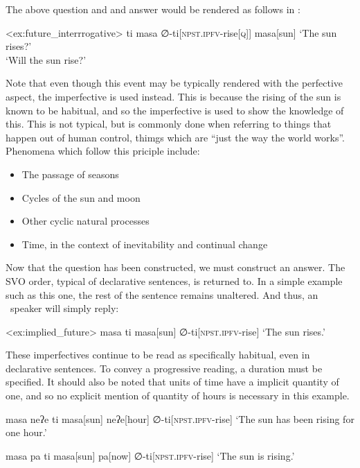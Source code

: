 The above question and and answer would be rendered as follows in \langname :

\ex<ex:future_interrrogative>
\begingl
\glpreamble ti masa
\endpreamble
∅-ti[\textsc{npst.ipfv-}rise\textsc{[q]}]
masa[sun]
\glft `The sun rises?'\\`Will the sun rise?'
\endgl
\xe

Note that even though this event may be typically rendered with the perfective aspect, the imperfective is used instead.
This is because the rising of the sun is known to be habitual, and so the imperfective is used to show the knowledge of this.
This is not typical, but is commonly done when referring to things that happen out of human control, thimgs which are ``just the way the world works''.
Phenomena which follow this priciple include:

\begin{itemize}
  \item The passage of seasons
  \item Cycles of the sun and moon
  \item Other cyclic natural processes
  \item Time, in the context of inevitability and continual change
\end{itemize}

Now that the question has been constructed, we must construct an answer.
The SVO order, typical of declarative sentences, is returned to.
In a simple example such as this one, the rest of the sentence remains unaltered.
And thus, an \langname\ speaker will simply reply:

\ex<ex:implied_future>
\begingl
\glpreamble masa ti
\endpreamble
masa[sun] ∅-ti[\textsc{npst.ipfv-}rise]
\glft `The sun rises.'
\endgl
\xe

These imperfectives continue to be read as specifically habitual, even in declarative sentences.
To convey a progressive reading, a duration must be specified.
It should also be noted that units of time have a implicit quantity of one, and so no explicit mention of quantity of hours is necessary in this example.

\ex
\begingl
\glpreamble masa neʔe ti
\endpreamble
masa[sun]
neʔe[hour]
∅-ti[\textsc{npst.ipfv-}rise]
\glft `The sun has been rising for one hour.'
\endgl
\xe

\ex
\begingl
\glpreamble masa pa ti
\endpreamble
masa[sun]
pa[now]
∅-ti[\textsc{npst.ipfv-}rise]
\glft `The sun is rising.'
\endgl
\xe

